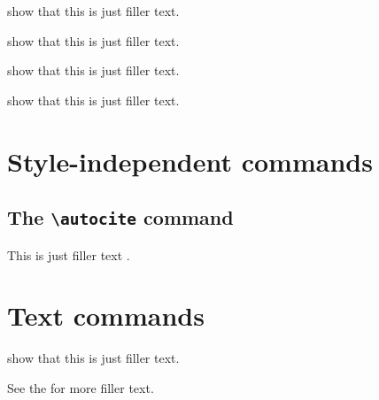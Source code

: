 \documentclass[a4paper]{article}
\newcommand{\cmd}[1]{\texttt{\textbackslash #1}}
\begin{document}

\textcite{companion} show that this is just filler text.

\textcite[59]{companion} show that this is just filler text.


\textcite[see][]{companion} show that this is just filler text.

\textcite[see][59--63]{companion} show that this is just filler text.

\section*{Style-independent commands}

\subsection*{The \cmd{autocite} command}


This is just filler text \autocite{companion}.

\section*{Text commands}


\citeauthor{companion} show that this is just filler text.


See the  for more filler text.
\end{document}
